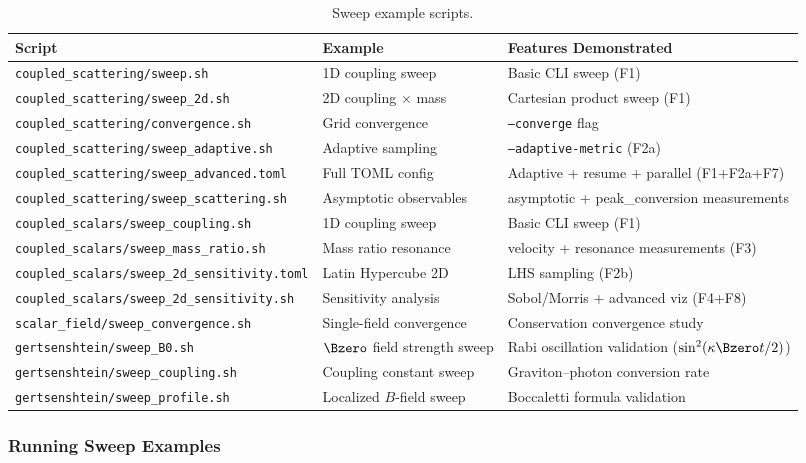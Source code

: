 \begin{table}[htbp]
\centering
\caption{Sweep example scripts.}
\label{tab:sweep-examples}
\begin{tabular}{@{}lll@{}}
\toprule
Script & Example & Features Demonstrated \\
\midrule
\texttt{coupled\_scattering/sweep.sh}           & 1D coupling sweep     & Basic CLI sweep (F1) \\
\texttt{coupled\_scattering/sweep\_2d.sh}       & 2D coupling $\times$ mass & Cartesian product sweep (F1) \\
\texttt{coupled\_scattering/convergence.sh}     & Grid convergence      & \texttt{--converge} flag \\
\texttt{coupled\_scattering/sweep\_adaptive.sh} & Adaptive sampling     & \texttt{--adaptive-metric} (F2a) \\
\texttt{coupled\_scattering/sweep\_advanced.toml}& Full TOML config     & Adaptive + resume + parallel (F1+F2a+F7) \\
\texttt{coupled\_scattering/sweep\_scattering.sh}& Asymptotic observables & asymptotic + peak\_conversion measurements \\
\texttt{coupled\_scalars/sweep\_coupling.sh}    & 1D coupling sweep     & Basic CLI sweep (F1) \\
\texttt{coupled\_scalars/sweep\_mass\_ratio.sh} & Mass ratio resonance  & velocity + resonance measurements (F3) \\
\texttt{coupled\_scalars/sweep\_2d\_sensitivity.toml} & Latin Hypercube 2D & LHS sampling (F2b) \\
\texttt{coupled\_scalars/sweep\_2d\_sensitivity.sh}   & Sensitivity analysis & Sobol/Morris + advanced viz (F4+F8) \\
\texttt{scalar\_field/sweep\_convergence.sh}    & Single-field convergence & Conservation convergence study \\
\texttt{gertsenshtein/sweep\_B0.sh}             & $\Bzero$ field strength sweep & Rabi oscillation validation ($\sin^2(\kappa\Bzero t/2)$) \\
\texttt{gertsenshtein/sweep\_coupling.sh}       & Coupling constant sweep & Graviton--photon conversion rate \\
\texttt{gertsenshtein/sweep\_profile.sh}        & Localized $B$-field sweep & Boccaletti formula validation \\
\bottomrule
\end{tabular}
\end{table}

\subsubsection{Running Sweep Examples}

